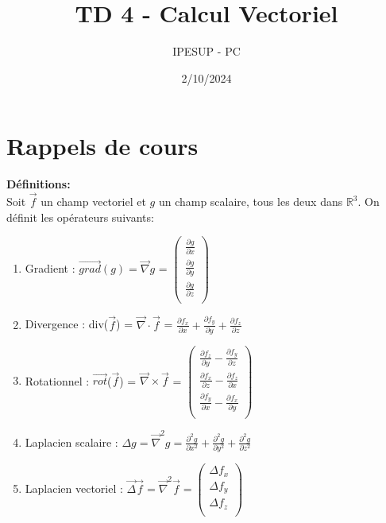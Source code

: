 \documentclass{article}
\title{TD 4 - Calcul Vectoriel}
\author{IPESUP - PC }
\date{2/10/2024}
\begin{document}
\maketitle

\section{Rappels de cours}

\textbf{Définitions:} \\[0.2cm]

Soit $\vec{f}$ un champ vectoriel et $g$ un champ scalaire, tous les deux dans $\mathbb{R}^3$. On définit les opérateurs suivants: 

\begin{enumerate}
  \item Gradient : $\vec{grad}(g) = \vec{\nabla} g$ = $\left( \begin{matrix}
    \frac{\partial g}{\partial x}  \\[0.1cm]
    \frac{\partial g}{\partial y}  \\[0.1cm]
    \frac{\partial g}{\partial z} \\[0.2cm]
    \end{matrix}
    \right) $

  \item Divergence : div($\vec{f}$) = \(\vec{\nabla} \cdot \vec{f}\) = \(\frac{\partial f_x}{\partial x} + \frac{\partial f_y}{\partial y} + \frac{\partial f_z}{\partial z}\) \\[0.2cm]
  \item Rotationnel : $\vec{rot}$($\vec{f}$) = \(\vec{\nabla} \times \vec{f}\) = 
    $ \left( \begin{matrix}
    \frac{\partial f_z}{\partial y} - \frac{\partial f_y}{\partial z}  \\[0.1cm]
    \frac{\partial f_x}{\partial z} - \frac{\partial f_z}{\partial x}  \\[0.1cm]
    \frac{\partial f_y}{\partial x} - \frac{\partial f_x}{\partial y} \\[0.1cm]
  

  \end{matrix} \right) $ 
  \item Laplacien scalaire : $\Delta g =  \vec{\nabla}^2 g = \frac{\partial^2 g}{\partial x^2} + \frac{\partial^2 g}{\partial y^2} + \frac{\partial^2 g}{\partial z^2}$
  \item Laplacien vectoriel : $\vec{\Delta} \vec{f} = \vec{\nabla}^2 \vec{f} =
   \left( \begin{matrix}
    \Delta  f_x  \\[0.1cm]
    \Delta  f_y  \\[0.1cm]
    \Delta  f_z \\[0.1cm]
    \end{matrix}  \right) $ 
\end{enumerate}
\end{document}
